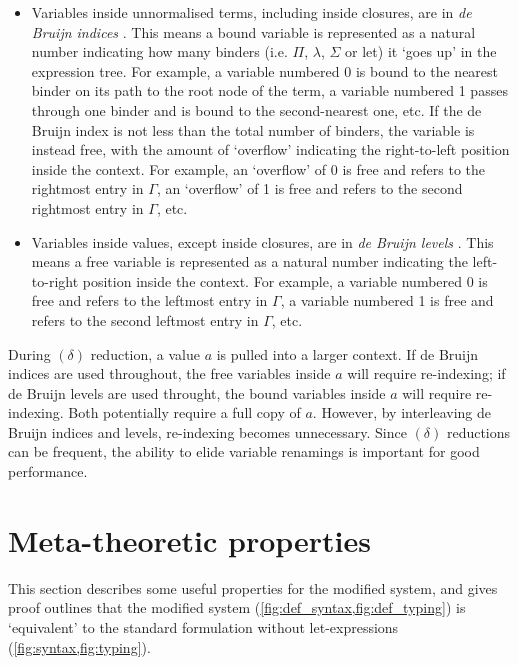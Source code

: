 \documentclass[twoside]{report}
\begin{document}
\begin{itemize}
    \item Variables inside unnormalised terms, including inside closures, are in \emph{de Bruijn indices} \cite{de1972lambda}. This means a bound variable is represented as a natural number indicating how many binders (i.e. $\Pi$, $\lambda$, $\Sigma$ or let) it `goes up' in the expression tree. For example, a variable numbered 0 is bound to the nearest binder on its path to the root node of the term, a variable numbered 1 passes through one binder and is bound to the second-nearest one, etc. If the de Bruijn index is not less than the total number of binders, the variable is instead free, with the amount of `overflow' indicating the right-to-left position inside the context. For example, an `overflow' of 0 is free and refers to the rightmost entry in $\Gamma$, an `overflow' of 1 is free and refers to the second rightmost entry in $\Gamma$, etc.

    \item Variables inside values, except inside closures, are in \emph{de Bruijn levels} \cite{de1972lambda}. This means a free variable is represented as a natural number indicating the left-to-right position inside the context. For example, a variable numbered 0 is free and refers to the leftmost entry in $\Gamma$, a variable numbered 1 is free and refers to the second leftmost entry in $\Gamma$, etc.
\end{itemize}

During $(\delta)$ reduction, a value $a$ is pulled into a larger context. If de Bruijn indices are used throughout, the free variables inside $a$ will require re-indexing; if de Bruijn levels are used throught, the bound variables inside $a$ will require re-indexing. Both potentially require a full copy of $a$. However, by interleaving de Bruijn indices and levels, re-indexing becomes unnecessary. Since $(\delta)$ reductions can be frequent, the ability to elide variable renamings is important for good performance.

\section{Meta-theoretic properties}
\label{sec:type_theory_def_properties}

This section describes some useful properties for the modified system, and gives proof outlines that the modified system (\cref{fig:def_syntax,fig:def_typing}) is `equivalent' to the standard formulation without let-expressions (\cref{fig:syntax,fig:typing}).
\end{document}

